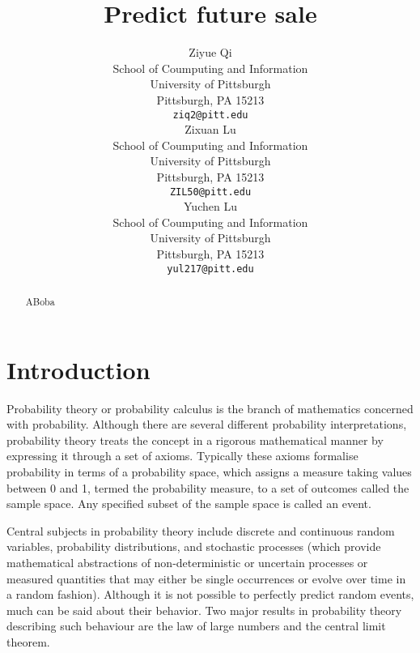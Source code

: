 \documentclass{article}
\title{Predict future sale}
\author{
 Ziyue Qi \\
  School of Coumputing and Information\\
  University of Pittsburgh\\
  Pittsburgh, PA 15213 \\
  \texttt{ziq2@pitt.edu} \\
   \And
 Zixuan Lu \\
  School of Coumputing and Information\\
  University of Pittsburgh\\
  Pittsburgh, PA 15213 \\
  \texttt{ZIL50@pitt.edu} \\
  \And
 Yuchen Lu \\
  School of Coumputing and Information\\
  University of Pittsburgh\\
  Pittsburgh, PA 15213 \\
  \texttt{yul217@pitt.edu} \\
}
\begin{document}
\maketitle
\begin{abstract}
ABoba
\end{abstract}



\section{Introduction}
Probability theory or probability calculus is the branch of mathematics concerned with probability. Although there are several different probability interpretations, probability theory treats the concept in a rigorous mathematical manner by expressing it through a set of axioms. Typically these axioms formalise probability in terms of a probability space, which assigns a measure taking values between 0 and 1, termed the probability measure, to a set of outcomes called the sample space. Any specified subset of the sample space is called an event.

Central subjects in probability theory include discrete and continuous random variables, probability distributions, and stochastic processes (which provide mathematical abstractions of non-deterministic or uncertain processes or measured quantities that may either be single occurrences or evolve over time in a random fashion). Although it is not possible to perfectly predict random events, much can be said about their behavior. Two major results in probability theory describing such behaviour are the law of large numbers and the central limit theorem.




\begin{thebibliography}{1}


\end{thebibliography}
\end{document}

